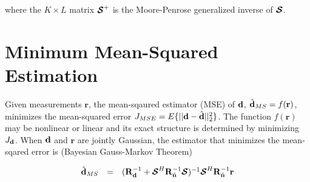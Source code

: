 \documentclass[a4paper,11pt,fleqn]{article}
\newcommand{\br}{{\mathbf r}}
\newcommand{\bd}{{\bf d}}
\newcommand{\bn}{{\bf n}}
\newcommand{\bR}{{\bf R}}
\newcommand{\bcS}{{\mbox {\boldmath ${\cal S}$}}}
\begin{document}
\noindent where the $K\times L$ matrix $\bcS^+$ is the
Moore-Penrose generalized inverse of $\bcS$.

\section{Minimum Mean-Squared Estimation}
Given measurements $\br$, the mean-sqaured estimator (MSE) of
$\bd$, $\hat{\bd}_{MS} = f( \br )$, minimizes the mean-squared
error $J_{MSE}=E\{||\bd-\hat{\bd}||_2^2\}$. The function $f(\br)$
may be nonlinear or linear and its exact structure is determined
by minimizing $J_{\bd}$. When $\bd$ and $\br$ are jointly
Gaussian, the estimator that minimizes the mean-sqared error is
(Bayesian Gauss-Markov Theorem)

\begin{equation}
\begin{array}{rcl}
\hat{\bd}_{MS} &=&
(\bR_{\bd}^{-1}+\bcS^{H}\bR_{\tilde{\bn}}^{-1}\bcS)^{-1}\bcS^{H}\bR_{\tilde{\bn}}^{-1}\br
\end{array} \label{MSE}
\end{equation}







\end{document}
